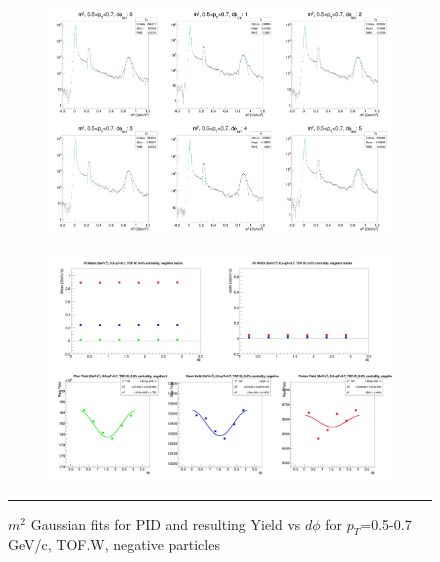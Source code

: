 \begin{figure}[H]
  \centering
    \begin{subfigure}{1\textwidth}
    \includegraphics[width=1\textwidth]{lowptfits/yieldvsdphi_tof1_cent0_ch0_pT-5-7.jpg}
    \end{subfigure}
    \begin{subfigure}{1\textwidth}
    \includegraphics[width=1\textwidth]{lowptfits/fitParams_tof1_cent0_ch0_pT-5-7.jpg}
    \end{subfigure}
    \rule{35em}{0.5pt}
  \caption[PID fits and Yield vs $d\phi$ for $p_T$=0.5-0.7 GeV/c, TOF.W, negative particles ]{$m^2$ Gaussian fits for PID and resulting Yield vs $d\phi$ for $p_T$=0.5-0.7 GeV/c, TOF.W, negative particles}
  \label{fig:fits5-7neg}
\end{figure}

